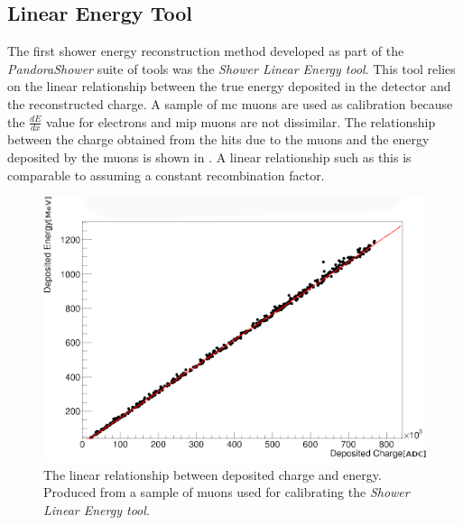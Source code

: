 \subsection{Linear Energy Tool}\label{subchap:Linear Energy Tool}
The first shower energy reconstruction method developed as part of the \textit{PandoraShower} suite of tools was the \textit{Shower Linear Energy tool}. This tool relies on the linear relationship between the true energy deposited in the detector and the reconstructed charge. A sample of \Gls{mc} muons are used as calibration because the $\frac{dE}{dx}$ value for electrons and \Gls{mip} muons are not dissimilar. The relationship between the charge obtained from the hits due to the muons and the energy deposited by the muons is shown in . A linear relationship such as this is comparable to assuming a constant recombination factor. 



\newpage
\begin{figure}[h]
    \centering
    \includegraphics[width = \largefigwidth]{figures-chap4/linear_energy_lookup_curve1.png}
    \caption{The linear relationship between deposited charge and energy. Produced from a sample of muons used for calibrating the \textit{Shower Linear Energy tool.}}
    \label{fig:linear lookup curve}
\end{figure}



